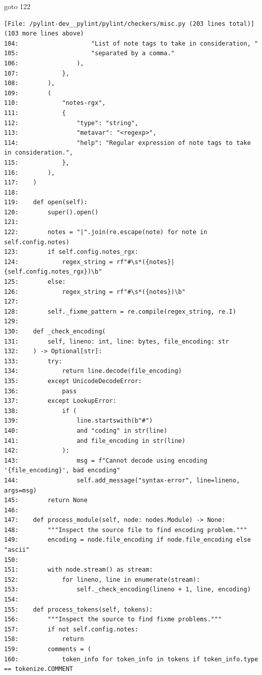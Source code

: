 {\begin{agentbox}
\hrulefill
\begin{CodeVerbatim}[breaklines=true, breakanywhere=true]
goto 122
\end{CodeVerbatim}
\end{agentbox}
\begin{observationbox}\begin{Verbatim}[breaklines=true, breakanywhere=true]
[File: /pylint-dev__pylint/pylint/checkers/misc.py (203 lines total)]
(103 more lines above)
104:                    "List of note tags to take in consideration, "
105:                    "separated by a comma."
106:                ),
107:            },
108:        ),
109:        (
110:            "notes-rgx",
111:            {
112:                "type": "string",
113:                "metavar": "<regexp>",
114:                "help": "Regular expression of note tags to take in consideration.",
115:            },
116:        ),
117:    )
118:
119:    def open(self):
120:        super().open()
121:
122:        notes = "|".join(re.escape(note) for note in self.config.notes)
123:        if self.config.notes_rgx:
124:            regex_string = rf"#\s*({notes}|{self.config.notes_rgx})\b"
125:        else:
126:            regex_string = rf"#\s*({notes})\b"
127:
128:        self._fixme_pattern = re.compile(regex_string, re.I)
129:
130:    def _check_encoding(
131:        self, lineno: int, line: bytes, file_encoding: str
132:    ) -> Optional[str]:
133:        try:
134:            return line.decode(file_encoding)
135:        except UnicodeDecodeError:
136:            pass
137:        except LookupError:
138:            if (
139:                line.startswith(b"#")
140:                and "coding" in str(line)
141:                and file_encoding in str(line)
142:            ):
143:                msg = f"Cannot decode using encoding '{file_encoding}', bad encoding"
144:                self.add_message("syntax-error", line=lineno, args=msg)
145:        return None
146:
147:    def process_module(self, node: nodes.Module) -> None:
148:        """Inspect the source file to find encoding problem."""
149:        encoding = node.file_encoding if node.file_encoding else "ascii"
150:
151:        with node.stream() as stream:
152:            for lineno, line in enumerate(stream):
153:                self._check_encoding(lineno + 1, line, encoding)
154:
155:    def process_tokens(self, tokens):
156:        """Inspect the source to find fixme problems."""
157:        if not self.config.notes:
158:            return
159:        comments = (
160:            token_info for token_info in tokens if token_info.type == tokenize.COMMENT

\end{Verbatim}
\end{observationbox}}
